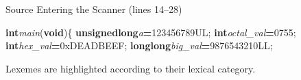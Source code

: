 \documentclass[aspectratio=169]{beamer}
\newcommand{\KW}[1]{\textcolor{keywordcolor}{\textbf{#1}}}
\newcommand{\ID}[1]{\textcolor{identifiercolor}{\textit{#1}}}
\newcommand{\INT}[1]{\colorbox{integercolor!15}{\textcolor{integercolor}{#1}}}
\newcommand{\OP}[1]{\textcolor{operatorcolor}{\textbf{#1}}}
\newcommand{\DELIM}[1]{\textcolor{delimitercolor}{#1}}
\begin{document}
\begin{frame}[fragile]{Source Entering the Scanner (lines 14--28)}
\begin{block}{}
\KW{int}\hspace*{0.18em}\ID{main}\DELIM{(}\KW{void}\DELIM{)}\hspace*{0.18em}\DELIM{\{}
\hspace*{0.18em}\hspace*{0.18em}\hspace*{0.18em}\hspace*{0.18em}
\hspace*{0.18em}\hspace*{0.18em}\hspace*{0.18em}\hspace*{0.18em}\KW{unsigned}\hspace*{0.18em}\KW{long}\hspace*{0.18em}\ID{a}\hspace*{0.18em}\OP{=}\hspace*{0.18em}\INT{123456789UL}\DELIM{;}
\hspace*{0.18em}\hspace*{0.18em}\hspace*{0.18em}\hspace*{0.18em}\KW{int}\hspace*{0.18em}\ID{octal\_val}\hspace*{0.18em}\OP{=}\hspace*{0.18em}\INT{0755}\DELIM{;}
\hspace*{0.18em}\hspace*{0.18em}\hspace*{0.18em}\hspace*{0.18em}\KW{int}\hspace*{0.18em}\ID{hex\_val}\hspace*{0.18em}\OP{=}\hspace*{0.18em}\INT{0xDEADBEEF}\DELIM{;}
\hspace*{0.18em}\hspace*{0.18em}\hspace*{0.18em}\hspace*{0.18em}\KW{long}\hspace*{0.18em}\KW{long}\hspace*{0.18em}\ID{big\_val}\hspace*{0.18em}\OP{=}\hspace*{0.18em}\INT{9876543210LL}\DELIM{;}

\hspace*{0.18em}\hspace*{0.18em}\hspace*{0.18em}\hspace*{0.18em}
\end{block}
\vspace{0.1cm}
{\tiny Lexemes are highlighted according to their lexical category.}
\end{frame}
\end{document}
